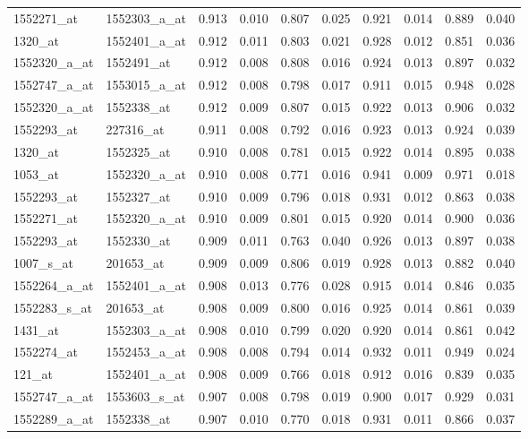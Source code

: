 \documentclass[a4paper, 12pt]{report}
\begin{document}
\begin{footnotesize}
\begin{longtable}{ | >{}m{2cm}| >{}m{2cm} | >{}m{0.8cm}| >{}m{0.8cm} |>{}m{0.8cm}| >{}m{0.8cm} |>{}m{0.8cm}| >{}m{0.8cm} |>{}m{0.8cm}| >{}m{0.8cm} |}
  1552271\_at & 1552303\_a\_at & 0.913 & 0.010 & 0.807 & 0.025 & 0.921 & 0.014 & 0.889 & 0.040 \\ 
  1320\_at & 1552401\_a\_at & 0.912 & 0.011 & 0.803 & 0.021 & 0.928 & 0.012 & 0.851 & 0.036 \\ 
  1552320\_a\_at & 1552491\_at & 0.912 & 0.008 & 0.808 & 0.016 & 0.924 & 0.013 & 0.897 & 0.032 \\ 
  1552747\_a\_at & 1553015\_a\_at & 0.912 & 0.008 & 0.798 & 0.017 & 0.911 & 0.015 & 0.948 & 0.028 \\ 
  1552320\_a\_at & 1552338\_at & 0.912 & 0.009 & 0.807 & 0.015 & 0.922 & 0.013 & 0.906 & 0.032 \\ 
  1552293\_at & 227316\_at & 0.911 & 0.008 & 0.792 & 0.016 & 0.923 & 0.013 & 0.924 & 0.039 \\ 
  1320\_at & 1552325\_at & 0.910 & 0.008 & 0.781 & 0.015 & 0.922 & 0.014 & 0.895 & 0.038 \\ 
  1053\_at & 1552320\_a\_at & 0.910 & 0.008 & 0.771 & 0.016 & 0.941 & 0.009 & 0.971 & 0.018 \\ 
  1552293\_at & 1552327\_at & 0.910 & 0.009 & 0.796 & 0.018 & 0.931 & 0.012 & 0.863 & 0.038 \\ 
  1552271\_at & 1552320\_a\_at & 0.910 & 0.009 & 0.801 & 0.015 & 0.920 & 0.014 & 0.900 & 0.036 \\ 
  1552293\_at & 1552330\_at & 0.909 & 0.011 & 0.763 & 0.040 & 0.926 & 0.013 & 0.897 & 0.038 \\ 
  1007\_s\_at & 201653\_at & 0.909 & 0.009 & 0.806 & 0.019 & 0.928 & 0.013 & 0.882 & 0.040 \\ 
  1552264\_a\_at & 1552401\_a\_at & 0.908 & 0.013 & 0.776 & 0.028 & 0.915 & 0.014 & 0.846 & 0.035 \\ 
  1552283\_s\_at & 201653\_at & 0.908 & 0.009 & 0.800 & 0.016 & 0.925 & 0.014 & 0.861 & 0.039 \\ 
  1431\_at & 1552303\_a\_at & 0.908 & 0.010 & 0.799 & 0.020 & 0.920 & 0.014 & 0.861 & 0.042 \\ 
  1552274\_at & 1552453\_a\_at & 0.908 & 0.008 & 0.794 & 0.014 & 0.932 & 0.011 & 0.949 & 0.024 \\ 
  121\_at & 1552401\_a\_at & 0.908 & 0.009 & 0.766 & 0.018 & 0.912 & 0.016 & 0.839 & 0.035 \\ 
  1552747\_a\_at & 1553603\_s\_at & 0.907 & 0.008 & 0.798 & 0.019 & 0.900 & 0.017 & 0.929 & 0.031 \\ 
  1552289\_a\_at & 1552338\_at & 0.907 & 0.010 & 0.770 & 0.018 & 0.931 & 0.011 & 0.866 & 0.037 \\ 

\end{longtable}
\end{footnotesize}
\end{document}
